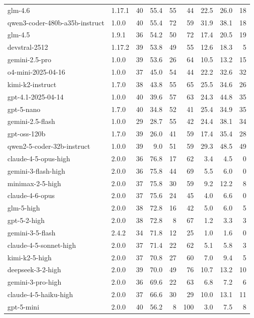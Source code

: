 {\begin{tabular}{@{}llrrrrrrr@{}}
glm-4.6 & 1.17.1 & 40 & 55.4 & 55 & 44 & 22.5 & 26.0 & 18 \\
qwen3-coder-480b-a35b-instruct & 1.0.0 & 40 & 55.4 & 72 & 59 & 31.9 & 38.1 & 18 \\
glm-4.5 & 1.9.1 & 36 & 54.2 & 50 & 72 & 17.4 & 20.5 & 19 \\
devstral-2512 & 1.17.2 & 39 & 53.8 & 49 & 55 & 12.6 & 18.3 & 5 \\
gemini-2.5-pro & 1.0.0 & 39 & 53.6 & 26 & 64 & 10.5 & 13.2 & 15 \\
o4-mini-2025-04-16 & 1.0.0 & 37 & 45.0 & 54 & 44 & 22.2 & 32.6 & 32 \\
kimi-k2-instruct & 1.7.0 & 38 & 43.8 & 55 & 65 & 25.5 & 34.6 & 26 \\
gpt-4.1-2025-04-14 & 1.0.0 & 40 & 39.6 & 57 & 63 & 24.3 & 44.8 & 35 \\
gpt-5-nano & 1.7.0 & 40 & 34.8 & 52 & 41 & 25.4 & 34.9 & 35 \\
gemini-2.5-flash & 1.0.0 & 29 & 28.7 & 55 & 42 & 24.4 & 38.1 & 34 \\
gpt-oss-120b & 1.7.0 & 39 & 26.0 & 41 & 59 & 17.4 & 35.4 & 28 \\
qwen2-5-coder-32b-instruct & 1.0.0 & 39 & 9.0 & 51 & 59 & 29.3 & 48.5 & 49 \\
\midrule
claude-4-5-opus-high & 2.0.0 & 36 & 76.8 & 17 & 62 & 3.4 & 4.5 & 0 \\
gemini-3-flash-high & 2.0.0 & 36 & 75.8 & 44 & 69 & 5.5 & 6.0 & 0 \\
minimax-2-5-high & 2.0.0 & 37 & 75.8 & 30 & 59 & 9.2 & 12.2 & 8 \\
claude-4-6-opus & 2.0.0 & 37 & 75.6 & 24 & 45 & 4.0 & 6.6 & 0 \\
glm-5-high & 2.0.0 & 38 & 72.8 & 16 & 42 & 5.0 & 6.0 & 5 \\
gpt-5-2-high & 2.0.0 & 38 & 72.8 & 8 & 67 & 1.2 & 3.3 & 3 \\
gemini-3-5-flash & 2.4.2 & 34 & 71.8 & 12 & 25 & 1.0 & 1.6 & 0 \\
claude-4-5-sonnet-high & 2.0.0 & 37 & 71.4 & 22 & 62 & 5.1 & 5.8 & 3 \\
kimi-k2-5-high & 2.0.0 & 37 & 70.8 & 27 & 60 & 7.0 & 9.4 & 5 \\
deepseek-3-2-high & 2.0.0 & 39 & 70.0 & 49 & 76 & 10.7 & 13.2 & 10 \\
gemini-3-pro-high & 2.0.0 & 36 & 69.6 & 22 & 63 & 6.8 & 7.2 & 6 \\
claude-4-5-haiku-high & 2.0.0 & 37 & 66.6 & 30 & 29 & 10.0 & 13.1 & 11 \\
gpt-5-mini & 2.0.0 & 40 & 56.2 & 8 & 100 & 3.0 & 7.5 & 8 \\
\bottomrule
\end{tabular}
}
